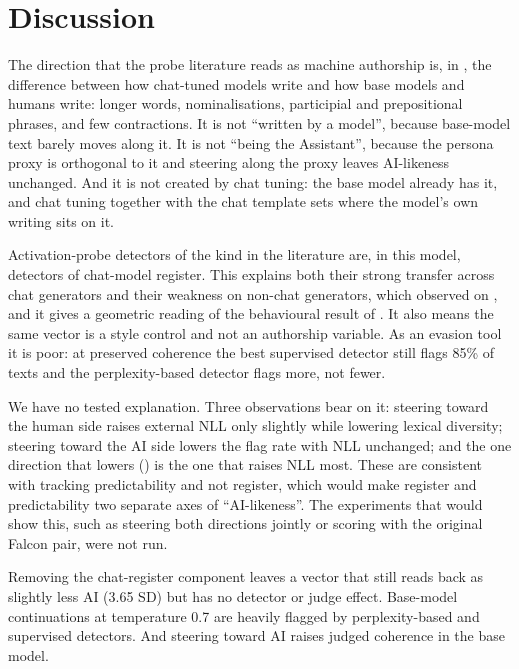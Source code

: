 \section{Discussion}
\label{sec:discussion}

The direction that the probe literature reads as machine authorship is, in \llamai, the difference between how chat-tuned models write and how base models and humans write: longer words, nominalisations, participial and prepositional phrases, and few contractions.
It is not ``written by a model'', because base-model text barely moves along it.
It is not ``being the Assistant'', because the persona proxy is orthogonal to it and steering along the proxy leaves AI-likeness unchanged.
And it is not created by chat tuning: the base model already has it, and chat tuning together with the chat template sets where the model's own writing sits on it.

Activation-probe detectors of the kind in the literature are, in this model, detectors of chat-model register.
This explains both their strong transfer across chat generators and their weakness on non-chat generators, which \citet{vishnyakov2026svdetect} observed on \raid, and it gives a geometric reading of the behavioural result of \citet{xu2026base}.
It also means the same vector is a style control and not an authorship variable.
As an evasion tool it is poor: at preserved coherence the best supervised detector still flags 85\% of texts and the perplexity-based detector flags more, not fewer.

We have no tested explanation.
Three observations bear on it: steering toward the human side raises external NLL only slightly while lowering lexical diversity; steering toward the AI side lowers the \bino flag rate with NLL unchanged; and the one direction that lowers \bino (\aibase) is the one that raises NLL most.
These are consistent with \bino tracking predictability and not register, which would make register and predictability two separate axes of ``AI-likeness''.
The experiments that would show this, such as steering both directions jointly or scoring with the original Falcon pair, were not run.

Removing the chat-register component leaves a vector that still reads back as slightly less AI (3.65 SD) but has no detector or judge effect.
Base-model continuations at temperature 0.7 are heavily flagged by perplexity-based and supervised detectors.
And steering toward AI raises judged coherence in the base model.

